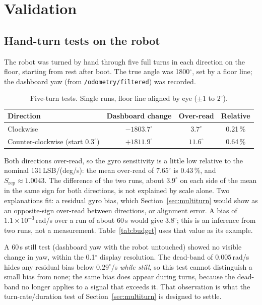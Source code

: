 \documentclass[11pt,a4paper]{report}
\newcommand{\code}[1]{\texttt{#1}}
\begin{document}
\chapter[Validation]{Validation}\label{ch:valid}

\section{Hand-turn tests on the robot}
The robot was turned by hand through five full turns in each direction on the floor, starting from rest after boot. The true angle was 1800$^\circ$, set by a floor line; the dashboard yaw (from \code{/odometry/filtered}) was recorded.

\begin{table}[H]
\centering
\caption{Five-turn tests. Single runs, floor line aligned by eye ($\pm1$ to $2^\circ$).}\label{tab:fiveturn}
\small
\begin{tabular}{@{}lccc@{}}
\toprule
Direction & Dashboard change & Over-read & Relative\\
\midrule
Clockwise & $-1803.7^\circ$ & $3.7^\circ$ & 0.21\,\%\\
Counter-clockwise (start $0.3^\circ$) & $+1811.9^\circ$ & $11.6^\circ$ & 0.64\,\%\\
\bottomrule
\end{tabular}
\end{table}

Both directions over-read, so the gyro sensitivity is a little low relative to the nominal 131\,LSB/(deg/s): the mean over-read of $7.65^\circ$ is $0.43\,\%$, and $S_{\mathrm{rep}}\approx1.0043$. The difference of the two runs, about $3.9^\circ$ on each side of the mean in the same sign for both directions, is not explained by scale alone. Two explanations fit: a residual gyro bias, which Section~\ref{sec:multiturn} would show as an opposite-sign over-read between directions, or alignment error. A bias of $1.1\times10^{-3}$\,rad/s over a run of about 60\,s would give $3.8^\circ$; this is an inference from two runs, not a measurement. Table~\ref{tab:budget} uses that value as its example.

A 60\,s still test (dashboard yaw with the robot untouched) showed no visible change in yaw, within the 0.1$^\circ$ display resolution. The dead-band of $0.005$\,rad/s hides any residual bias below $0.29^\circ$/s \emph{while still}, so this test cannot distinguish a small bias from none; the same bias does appear during turns, because the dead-band no longer applies to a signal that exceeds it. That observation is what the turn-rate/duration test of Section~\ref{sec:multiturn} is designed to settle.
\end{document}
